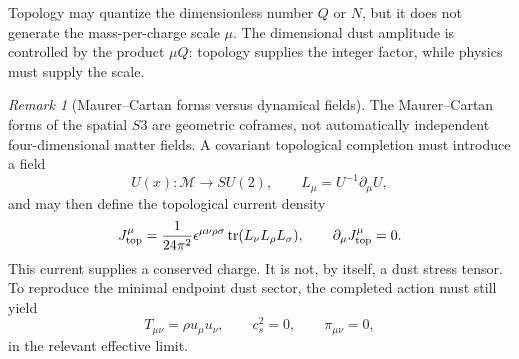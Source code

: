 \documentclass[11pt,a4paper]{article}
\def\Sthree{S3}%
\numberwithin{equation}{section}
\theoremstyle{remark}
\newtheorem{remark}[criterion]{Remark}
\newcommand{\Sthree}{S^3}
\newcommand{\M}{\mathcal{M}}
\begin{document}
Topology may quantize the dimensionless number \(Q\) or \(N\), but it does not generate the mass-per-charge scale \(\mu\). The dimensional dust amplitude is controlled by the product \(\mu Q\): topology supplies the integer factor, while physics must supply the scale.

\begin{remark}[Maurer--Cartan forms versus dynamical fields]
The Maurer--Cartan forms of the spatial \(\Sthree\) are geometric coframes, not automatically independent four-dimensional matter fields. A covariant topological completion must introduce a field
\begin{equation}
U(x):\M\longrightarrow SU(2),
\qquad
L_\mu=U^{-1}\partial_\mu U,
\end{equation}
and may then define the topological current density
\begin{equation}
J^\mu_{\rm top}
=
\frac{1}{24\pi^2}
\epsilon^{\mu\nu\rho\sigma}
\operatorname{tr}(L_\nu L_\rho L_\sigma),
\qquad
\partial_\mu J^\mu_{\rm top}=0.
\end{equation}
This current supplies a conserved charge. It is not, by itself, a dust stress tensor. To reproduce the minimal endpoint dust sector, the completed action must still yield
\begin{equation}
T_{\mu\nu}=\rho u_\mu u_\nu,
\qquad
c_s^2=0,
\qquad
\pi_{\mu\nu}=0,
\end{equation}
in the relevant effective limit.
\end{remark}
\end{document}
